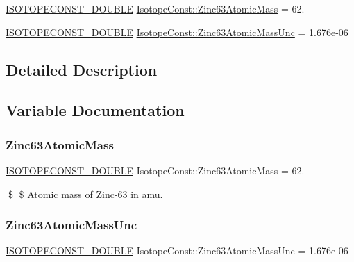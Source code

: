\begin{DoxyCompactItemize}
\item 
\mbox{\hyperlink{group___isotope_const-_macros_ga8f45a7272ce02c0b4c65c44636ed719a}{I\+S\+O\+T\+O\+P\+E\+C\+O\+N\+S\+T\+\_\+\+D\+O\+U\+B\+LE}} \mbox{\hyperlink{group___isotope_const-_zinc-_zn63_ga2f96ba26fdeb2afedcbea021cff33561}{Isotope\+Const\+::\+Zinc63\+Atomic\+Mass}} = 62.
\item 
\mbox{\hyperlink{group___isotope_const-_macros_ga8f45a7272ce02c0b4c65c44636ed719a}{I\+S\+O\+T\+O\+P\+E\+C\+O\+N\+S\+T\+\_\+\+D\+O\+U\+B\+LE}} \mbox{\hyperlink{group___isotope_const-_zinc-_zn63_ga50f0985ced05075e1101044a0bfea738}{Isotope\+Const\+::\+Zinc63\+Atomic\+Mass\+Unc}} = 1.\+676e-\/06
\end{DoxyCompactItemize}


\subsection{Detailed Description}


\subsection{Variable Documentation}
\mbox{\label{group___isotope_const-_zinc-_zn63_ga2f96ba26fdeb2afedcbea021cff33561}} 
\subsubsection{\texorpdfstring{Zinc63\+Atomic\+Mass}{Zinc63AtomicMass}}
{\footnotesize\ttfamily \mbox{\hyperlink{group___isotope_const-_macros_ga8f45a7272ce02c0b4c65c44636ed719a}{I\+S\+O\+T\+O\+P\+E\+C\+O\+N\+S\+T\+\_\+\+D\+O\+U\+B\+LE}} Isotope\+Const\+::\+Zinc63\+Atomic\+Mass = 62.}

\$ \$ Atomic mass of Zinc-\/63 in amu. \mbox{\label{group___isotope_const-_zinc-_zn63_ga50f0985ced05075e1101044a0bfea738}} 
\subsubsection{\texorpdfstring{Zinc63\+Atomic\+Mass\+Unc}{Zinc63AtomicMassUnc}}
{\footnotesize\ttfamily \mbox{\hyperlink{group___isotope_const-_macros_ga8f45a7272ce02c0b4c65c44636ed719a}{I\+S\+O\+T\+O\+P\+E\+C\+O\+N\+S\+T\+\_\+\+D\+O\+U\+B\+LE}} Isotope\+Const\+::\+Zinc63\+Atomic\+Mass\+Unc = 1.\+676e-\/06}

